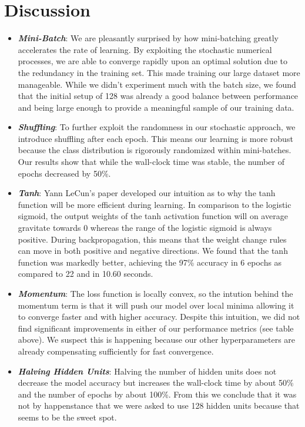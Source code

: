 \documentclass{article} %
\begin{document}
{{\newpage


\section*{Discussion}

\begin{itemize}
\item \textbf{\textit{Mini-Batch}}: We are pleasantly surprised by how mini-batching greatly accelerates the rate of learning.  By exploiting the stochastic numerical processes, we are able to converge rapidly upon an optimal solution due to the redundancy in the training set.  This made training our large dataset more manageable. While we didn't experiment much with the batch size, we found that the initial setup of 128 was already a good balance between performance and being large enough to provide a meaningful sample of our training data. 
\item \textbf{\textit{Shuffling}}: To further exploit the randomness in our stochastic approach, we introduce shuffling after each epoch.  This means our learning is more robust because the class distribution is rigorously randomized within mini-batches.  Our results show that while the wall-clock time was stable, the number of epochs decreased by 50\%. 
\item \textbf{\textit{Tanh}}: Yann LeCun's paper developed our intuition as to why the tanh function will be more efficient during learning.  In comparison to the logistic sigmoid, the output weights of the tanh activation function will on average gravitate towards 0 whereas the range of the logistic sigmoid is always positive.  During backpropagation, this means that the weight change rules can move in both positive and negative directions.  We found that the tanh function was markedly better, achieving the 97\% accuracy in 6 epochs as compared to 22 and in 10.60 seconds. 
\item \textbf{\textit{Momentum}}: The loss function is locally convex, so the intution behind the momentum term is that it will push our model over local minima allowing it to converge faster and with higher accuracy.  Despite this intuition, we did not find significant improvements in either of our performance metrics (see table above).  We suspect this is happening because our other hyperparameters are already compensating sufficiently for fast convergence.  
\item \textbf{\textit{Halving Hidden Units}}: Halving the number of hidden units does not decrease the model accuracy but increases the wall-clock time by about 50\% and the number of epochs by about 100\%.  From this we conclude that it was not by happenstance that we were asked to use 128 hidden units because that seems to be the sweet spot.  

\end{itemize}}}
\end{document}
